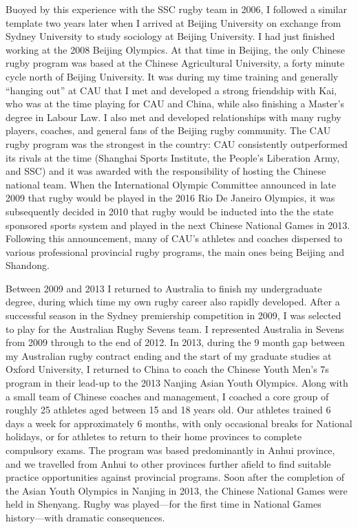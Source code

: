  Buoyed by this experience with the SSC rugby team in 2006, I followed a similar template two years later when I arrived at Beijing University on exchange from Sydney University to study sociology at Beijing University.  I had just finished working at the 2008 Beijing Olympics. At that time in Beijing, the only Chinese rugby program was based at the Chinese Agricultural University, a forty minute cycle north of Beijing University.  It was during my time training and generally ``hanging out'' at CAU that I met and developed a strong friendship with Kai, who was at the time playing for CAU and China, while also finishing a Master's degree in Labour Law.  I also met and developed relationships with many rugby players, coaches, and general fans of the Beijing rugby community.  The CAU rugby program was the strongest in the country: CAU consistently outperformed its rivals at the time (Shanghai Sports Institute, the People's Liberation Army, and SSC) and it was awarded with the responsibility of hosting the Chinese national team.  When the International Olympic Committee announced in late 2009 that rugby would be played in the 2016 Rio De Janeiro Olympics, it was subsequently decided in 2010 that rugby would be inducted into the the state sponsored sports system and played in the next Chinese National Games in 2013.  Following this announcement, many of CAU's athletes and coaches dispersed to various professional provincial rugby programs, the main ones being Beijing and Shandong.

  Between 2009 and 2013 I returned to Australia to finish my undergraduate degree, during which time my own rugby career also rapidly developed.  After a successful season in the Sydney premiership competition in 2009, I was selected to play for the Australian Rugby Sevens team. I represented Australia in Sevens from 2009 through to the end of 2012.  In 2013, during the 9 month gap between my Australian rugby contract ending and the start of my graduate studies at Oxford University, I returned to China to coach the Chinese Youth Men's 7s program in their lead-up to the 2013 Nanjing Asian Youth Olympics.  Along with a small team of Chinese coaches and management, I coached a core group of roughly 25 athletes aged between 15 and 18 years old. Our athletes trained 6 days a week for approximately 6 months, with only occasional breaks for National holidays, or for athletes to return to their home provinces to complete compulsory exams.  The program was based predominantly in Anhui province, and we travelled from Anhui to other provinces further afield to find suitable practice opportunities against provincial programs.  Soon after the completion of the Asian Youth Olympics in Nanjing in 2013, the Chinese National Games were held in Shenyang. Rugby was played---for the first time in National Games history---with dramatic consequences.


